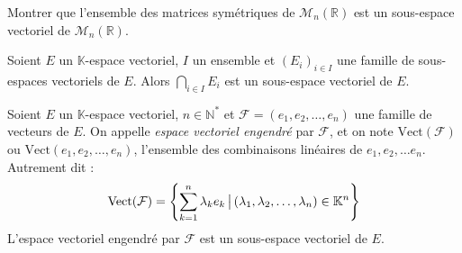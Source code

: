 \documentclass[a4paper,10pt]{report}
\begin{document}
\begin{ApplicationDirecte} Montrer que l'ensemble des matrices symétriques de $\mathcal{M}_n(\mathbb{R})$ est un sous-espace vectoriel de $\mathcal{M}_n(\mathbb{R})$. \end{ApplicationDirecte}

\begin{Proposition}{}
Soient $E$ un $\mathbb{K}$-espace vectoriel, $I$ un ensemble et $(E_i)_{i \in I}$ une famille de sous-espaces vectoriels de $E$. Alors $\bigcap_{i \in I} E_i$ est un sous-espace vectoriel de $E$.
\end{Proposition}

\begin{Demonstration}{}
\vspace{5cm}
\end{Demonstration}

\begin{TheoremeDefinition}{}
Soient $E$ un $\mathbb{K}$-espace vectoriel, $n \in \mathbb{N}^*$ et $\mathcal{F}=(e_1, e_2, \ldots, e_n)$ une famille de vecteurs de $E$. On appelle \emph{espace vectoriel engendré} par $\mathcal{F}$, et on note $\textrm{Vect}(\mathcal{F})$ ou $\textrm{Vect}(e_1, e_2, \ldots, e_n)$, l'ensemble des combinaisons linéaires de $e_1, e_2, \ldots e_n$. Autrement dit :
$$ \textrm{Vect}(\mathcal{F}) = \left\lbrace \sum_{k=1}^n \lambda_k e_k \, \big{\vert} \,  (\lambda_1, \lambda_2, \ldots, \lambda_n) \in \mathbb{K}^n \right\rbrace$$
L'espace vectoriel engendré par $\mathcal{F}$ est un sous-espace vectoriel de $E$.
\end{TheoremeDefinition}
\end{document}
